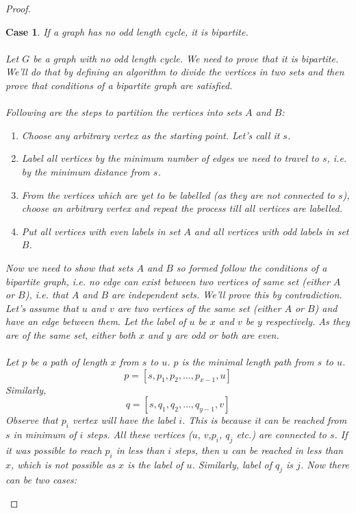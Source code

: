 \documentclass{article}
\newtheorem{case}{Case}
\begin{document}
\begin{proof}
    \begin{case}
        If a graph has no odd length cycle, it is bipartite.\\
        \\
        Let $G$ be a graph with no odd length cycle. We need to prove that it is bipartite. We'll do that by defining an algorithm to divide the vertices in two sets and then prove that conditions of a bipartite graph are satisfied.\\
        \\Following are the steps to partition the vertices into sets $A$ and $B$:
        \begin{enumerate}
            \item Choose any arbitrary vertex as the starting point. Let's call it $s$.
            \item Label all vertices by the minimum number of edges we need to travel to $s$, i.e. by the minimum distance from $s$.
            \item From the vertices which are yet to be labelled (as they are not connected to $s$), choose an arbitrary vertex and repeat the process till all vertices are labelled.
            \item Put all vertices with even labels in set $A$ and all vertices with odd labels in set $B$.
        \end{enumerate}
        Now we need to show that sets $A$ and $B$ so formed follow the conditions of a bipartite graph, i.e. no edge can exist between two vertices of same set (either $A$ or $B$), i.e. that $A$ and $B$ are independent sets. We'll prove this by contradiction. Let's assume that $u$ and $v$ are two vertices of the same set (either $A$ or $B$) and have an edge between them. Let the label of $u$ be $x$ and $v$ be $y$ respectively. As they are of the same set, either both $x$ and $y$ are odd or both are even.\\
        \\
        Let $p$ be a path of length $x$ from $s$ to $u$. $p$ is the minimal length path from $s$ to $u$.\\
        \begin{equation}
            p = [s,p_{1},p_{2},\dots,p_{x-1},u]
        \end{equation}
        \phantom{xxxxxxxxxxxxxxxxxxxxxxxxx}Similarly,
        \begin{equation}
            q = [s,q_{1},q_{2},\dots,q_{y-1},v]
        \end{equation}
        Observe that $p_{i}$ vertex will have the label $i$. This is because it can be reached from $s$ in minimum of $i$ steps. All these vertices ($u$, $v$,$p_{i}$, $q_{j}$ etc.) are connected to $s$. If it was possible to reach $p_{i}$ in less than $i$ steps, then $u$ can be reached in less than $x$, which is not possible as $x$ is the label of $u$. Similarly, label of $q_{j}$ is $j$. Now there can be two cases:\\

\end{case}
\end{proof}
\end{document}
